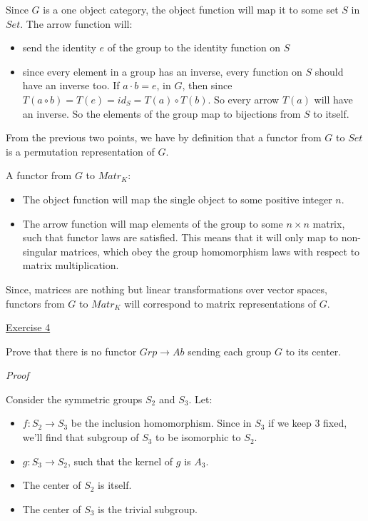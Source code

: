 \documentclass[11pt]{article}
\begin{document}
Since $G$ is a one object category, the object function will map it to some set $S$ in $Set$. The arrow function will: 
\begin{itemize}
	\item send the identity $e$ of the group to the identity function on $S$
	\item since every element in a group has an inverse, every function on $S$ should have an inverse too. If $a \cdot b = e$, in $G$, then since $T(a \circ b) = T(e) = id_S = T(a) \circ T(b)$. So every arrow $T(a)$ will have an inverse. So the elements of the group map to bijections from $S$ to itself.  
\end{itemize}

From the previous two points, we have by definition that a functor from $G$ to $Set$ is a permutation representation of $G$.

\vspace{2mm}

A functor from $G$ to $Matr_K$:

\begin{itemize}
	\item The object function will map the single object to some positive integer $n$.
	\item The arrow function will map elements of the group to some $n \times n$ matrix, such that functor laws are satisfied. This means that it will only map to non-singular matrices, which obey the group homomorphism laws with respect to matrix multiplication.
\end{itemize}

Since, matrices are nothing but linear transformations over vector spaces, functors from $G$ to $Matr_K$ will correspond to matrix representations of $G$. 

\vspace{2mm}

\noindent
\underline{Exercise 4}
\vspace{2mm}

Prove that there is no functor $Grp \rightarrow Ab$ sending each group $G$ to its center. 

\vspace{2mm}
\noindent
\emph{Proof}

Consider the symmetric groups $S_2$ and $S_3$. Let: 
\begin{itemize}
	\item $f : S_2 \rightarrow S_3$ be the inclusion homomorphism. Since in $S_3$ if we keep $3$ fixed, we'll find that subgroup of $S_3$ to be isomorphic to $S_2$. 
	\item $g: S_3 \rightarrow S_2$, such that the kernel of $g$ is $A_3$.  
	\item The center of $S_2$ is itself.
	\item The center of $S_3$ is the trivial subgroup. 
\end{itemize}
\end{document}
